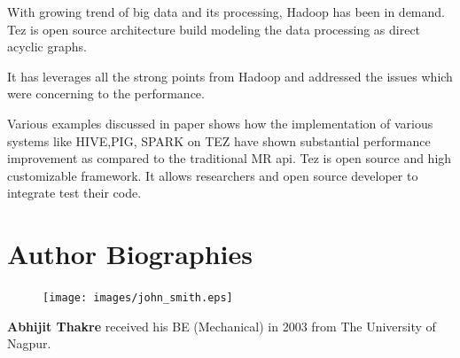 \documentclass[9pt,twocolumn,twoside]{../../styles/osajnl}
\begin{document}
  With growing trend of big data and its processing, Hadoop has been in demand. Tez is open source architecture build
  modeling the data processing as direct acyclic graphs. 

  It has leverages all the strong points from Hadoop and addressed the issues which were concerning to the performance.

  Various examples discussed in paper shows how the implementation of various systems like HIVE,PIG, SPARK on TEZ have 
  shown substantial performance improvement as compared to the traditional MR api.
  Tez is open source and high customizable framework. It allows researchers and open source developer to integrate test their code. 
  


 \newpage



 
\section*{Author Biographies}
\begingroup
\setlength\intextsep{0pt}
\begin{minipage}[t][3.2cm][t]{1.0\columnwidth} %
  \begin{figure}
    \texttt{[image: images/john\_smith.eps]}
  \end{figure}
  \noindent
  {\bfseries Abhijit Thakre} received his BE (Mechanical) in 2003 from
  The University of Nagpur.
\end{minipage}
\endgroup


\appendix
\end{document}
